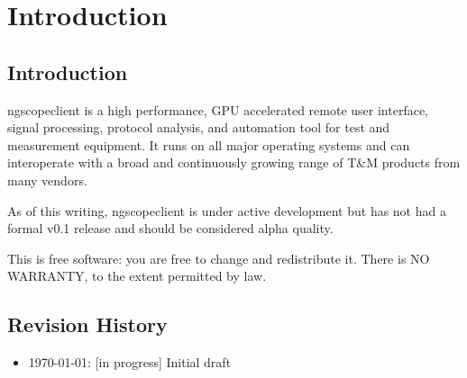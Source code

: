 \chapter{Introduction}

\section{Introduction}

ngscopeclient is a high performance, GPU accelerated remote user interface, signal processing, protocol analysis, and
automation tool for test and measurement equipment. It runs on all major operating systems and can interoperate with a
broad and continuously growing range of T\&M products from many vendors.

As of this writing, ngscopeclient is under active development but has not had a formal v0.1
release and should be considered alpha quality.

This is free software: you are free to change and redistribute it.
There is NO WARRANTY, to the extent permitted by law.

\section{Revision History}
\begin{itemize}
\item \today: [in progress] Initial draft
\end{itemize}
